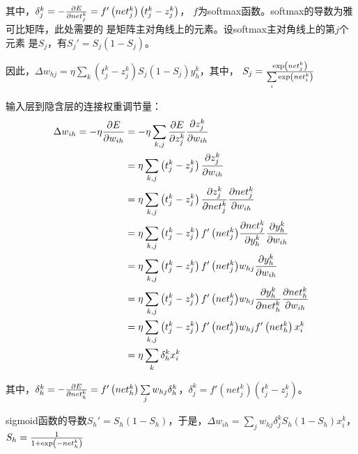 \documentclass{article}
\begin{document}
其中，$\delta _j^k =  - 
{{\partial E} \over {\partial net_j^k}} = 
f'\left( {net_j^k} \right)\left( {t_j^k - z_j^k} \right)$，
$f$为softmax函数。softmax的导数为雅可比矩阵，此处需要的
是矩阵主对角线上的元素。设softmax主对角线上的第$j$个元素
是$S_j$，有${{S_j}'} = {S_j}\left( {1 - {S_j}} \right)$。

因此，$\Delta {w_{hj}} =
\eta \sum\limits_k {\left( {t_j^k - z_j^k} \right)
{S_j}\left( {1 - {S_j}} \right)y_h^k} $，其中，
${S_j} = {{\exp \left( {net_j^k} \right)} 
\over {\sum\limits_i {\exp \left( {net_i^k} \right)} }}$

输入层到隐含层的连接权重调节量：
\begin{align*}
	\Delta {w_{ih}} 
	=  - \eta {{\partial E} \over {\partial {w_{ih}}}} 
	&=  - \eta \sum\limits_{k,j} {{{\partial E} \over {\partial z_j^k}}{{\partial z_j^k} \over {\partial {w_{ih}}}}} \\
	&= \eta \sum\limits_{k,j} {\left( {t_j^k - z_j^k} \right){{\partial z_j^k} \over {\partial {w_{ih}}}}} \\
	&= \eta \sum\limits_{k,j} {\left( {t_j^k - z_j^k} \right){{\partial z_j^k} \over {\partial net_j^k}}} {{\partial net_j^k} \over {\partial {w_{ih}}}}\\
	&= \eta \sum\limits_{k,j} {\left( {t_j^k - z_j^k} \right)f'\left( {net_j^k} \right)} {{\partial net_j^k} \over {\partial y_h^k}}{{\partial y_h^k} \over {\partial {w_{ih}}}}\\
	&= \eta \sum\limits_{k,j} {\left( {t_j^k - z_j^k} \right)f'\left( {net_j^k} \right)} {w_{hj}}{{\partial y_h^k} \over {\partial {w_{ih}}}}\\
	&= \eta \sum\limits_{k,j} {\left( {t_j^k - z_j^k} \right)f'\left( {net_j^k} \right)} {w_{hj}}{{\partial y_h^k} \over {\partial net_h^k}}{{\partial net_h^k} \over {\partial {w_{ih}}}}\\
	&= \eta \sum\limits_{k,j} {\left( {t_j^k - z_j^k} \right)f'\left( {net_j^k} \right)} {w_{hj}}f'\left( {net_h^k} \right)x_i^k\\
	&= \eta \sum\limits_k {\delta _h^k} x_i^k
\end{align*}

其中，$\delta _h^k =  - {{\partial E} \over {\partial net_h^k}} = f'\left( {net_h^k} \right)\sum\limits_j {{w_{hj}}\delta _h^k} $，$\delta _j^k = f'\left( {net_j^k} \right)\left( {t_j^k - z_j^k} \right)$。

sigmoid函数的导数${{S_h}'} = {{S_h}\left( {1 - {S_h}} \right)}$，于是，$\Delta {w_{ih}} 
= \sum\limits_j {{w_{hj}}\delta _j^k} {S_h}\left( {1 - {S_h}} \right)x_i^k$，${S_h} = {1 \over {1 + \exp \left( { - net_h^k} \right)}}$
\end{document}
